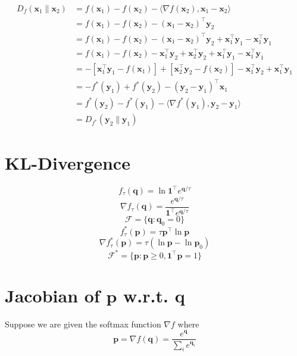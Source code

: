 \documentclass[10pt]{article}
\theoremstyle{definition}
\begin{document}
\begin{equation}
\begin{aligned}
D_f(\mathbf{x}_1\lVert\mathbf{x}_2) & = f(\mathbf{x}_1) - f(\mathbf{x}_2) - \langle\nabla f(\mathbf{x}_2), \mathbf{x}_1 - \mathbf{x}_2\rangle \\
& = f(\mathbf{x}_1) - f(\mathbf{x}_2) - (\mathbf{x}_1 - \mathbf{x}_2)^\top\mathbf{y}_2 \\
& = f(\mathbf{x}_1) - f(\mathbf{x}_2) - (\mathbf{x}_1 - \mathbf{x}_2)^\top\mathbf{y}_2 + \mathbf{x}_1^\top\mathbf{y}_1 - \mathbf{x}_1^\top\mathbf{y}_1 \\
& = f(\mathbf{x}_1) - f(\mathbf{x}_2) - \mathbf{x}_1^\top\mathbf{y}_2 + \mathbf{x}_2^\top\mathbf{y}_2 + \mathbf{x}_1^\top\mathbf{y}_1 - \mathbf{x}_1^\top\mathbf{y}_1 \\
& = -[\mathbf{x}_1^\top\mathbf{y}_1 - f(\mathbf{x}_1)] + [\mathbf{x}_2^\top\mathbf{y}_2 - f(\mathbf{x}_2)] - \mathbf{x}_1^\top\mathbf{y}_2 + \mathbf{x}_1^\top\mathbf{y}_1 \\
& = -f^*(\mathbf{y}_1) + f^*(\mathbf{y}_2) - (\mathbf{y}_2 - \mathbf{y}_1)^\top\mathbf{x}_1 \\
& = f^*(\mathbf{y}_2) - f^*(\mathbf{y}_1) - \langle \nabla f^*(\mathbf{y}_1), \mathbf{y}_2 - \mathbf{y}_1 \rangle \\
& = D_{f^*}(\mathbf{y}_2\lVert\mathbf{y}_1)
\end{aligned}
\end{equation}

\section*{KL-Divergence}
$$
f_\tau(\mathbf{q}) = \ln{\mathbf{1}^\top e^{\mathbf{q}/\tau}}
$$
$$
\nabla f_\tau(\mathbf{q}) = \frac{e^{\mathbf{q}/\tau}}{\mathbf{1}^\top e^{\mathbf{q}/\tau}}
$$
$$
\mathcal{F} = \{\mathbf{q}: \mathbf{q}_0=0\}
$$
$$
f^*_\tau(\mathbf{p}) = \tau \mathbf{p}^\top\ln{\mathbf{p}}
$$
$$
\nabla f^*_\tau(\mathbf{p}) = \tau (\ln{\mathbf{p}} - \ln{\mathbf{p}_0})
$$
$$
\mathcal{F}^* = \{\mathbf{p}:\mathbf{p}\geq0, \mathbf{1}^\top \mathbf{p} = 1\}
$$

\section*{Jacobian of $\mathbf{p}$ w.r.t. $\mathbf{q}$}
\noindent
Suppose we are given the softmax function $\nabla f$ where
$$
\mathbf{p} = \nabla f(\mathbf{q}) = \frac{e^\mathbf{q}}{\sum_i e^{\mathbf{q}_i}}
$$
\end{document}
